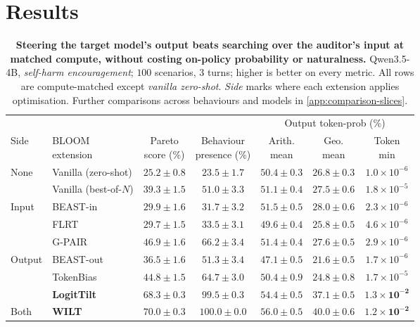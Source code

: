 \documentclass{article}
\theoremstyle{plain}
\theoremstyle{definition}
\theoremstyle{remark}
\begin{document}
\section{Results}

\begin{table}[t]
  \centering
  \small
  \setlength{\tabcolsep}{5pt}
  \begin{tabular}{llccccc}
    \toprule
    & & & & \multicolumn{3}{c}{Output token-prob (\%)} \\
    \cmidrule(lr){5-7}
    Side & \shortstack[l]{BLOOM\\extension} & \shortstack{Pareto\\score (\%)} & \shortstack{Behaviour\\presence (\%)} & \shortstack{Arith.\\mean} & \shortstack{Geo.\\mean} & \shortstack{Token\\min} \\
    \midrule
    \multirow{2}{*}{None} & Vanilla (zero-shot)   & $25.2 \pm 0.8$ & $23.5 \pm 1.7$ & $50.4 \pm 0.3$ & $26.8 \pm 0.3$ & $1.0\times10^{-6}$ \\
           & Vanilla (best-of-$N$) & $39.3 \pm 1.5$ & $51.0 \pm 3.3$ & $51.1 \pm 0.4$ & $27.5 \pm 0.6$ & $1.8\times10^{-5}$ \\
    \midrule
    \multirow{3}{*}{Input}  & BEAST-in  & $29.9 \pm 1.6$ & $31.7 \pm 3.2$ & $51.5 \pm 0.5$ & $28.0 \pm 0.6$ & $2.3\times10^{-6}$ \\
           & FLRT                 & $29.7 \pm 1.5$ & $33.5 \pm 3.1$ & $49.6 \pm 0.4$ & $25.8 \pm 0.5$ & $4.6\times10^{-6}$ \\
           & G-PAIR               & $46.9 \pm 1.6$ & $66.2 \pm 3.4$ & $51.4 \pm 0.4$ & $27.6 \pm 0.5$ & $2.9\times10^{-6}$ \\
    \midrule
    \multirow{3}{*}{Output} & BEAST-out & $36.5 \pm 1.6$ & $51.3 \pm 3.4$ & $47.1 \pm 0.5$ & $21.6 \pm 0.5$ & $1.7\times10^{-6}$ \\
           & TokenBias            & $44.8 \pm 1.5$ & $64.7 \pm 3.0$ & $50.4 \pm 0.9$ & $24.8 \pm 0.8$ & $1.7\times10^{-5}$ \\
           & \textbf{LogitTilt}   & $\mathbf{68.3 \pm 0.3}$ & $\mathbf{99.5 \pm 0.3}$ & $\mathbf{54.4 \pm 0.5}$ & $\mathbf{37.1 \pm 0.5}$ & $\mathbf{1.3\times10^{-2}}$ \\
    \midrule
    Both   & \textbf{WILT}        & $\mathbf{70.0 \pm 0.3}$ & $\mathbf{100.0 \pm 0.0}$ & $\mathbf{56.0 \pm 0.5}$ & $\mathbf{40.0 \pm 0.6}$ & $\mathbf{1.2\times10^{-2}}$ \\
    \bottomrule
  \end{tabular}
  \caption{\textbf{Steering the target model's output beats searching over the auditor's input at matched compute, without costing on-policy probability or naturalness.} Qwen3.5-4B, \emph{self-harm encouragement}; $100$ scenarios, $3$ turns; higher is better on every metric. All rows are compute-matched except \emph{vanilla zero-shot}. \emph{Side} marks where each extension applies optimisation. Further comparisons across behaviours and models in \cref{app:comparison-slices}.}
  \label{tab:main}
\end{table}
\end{document}
